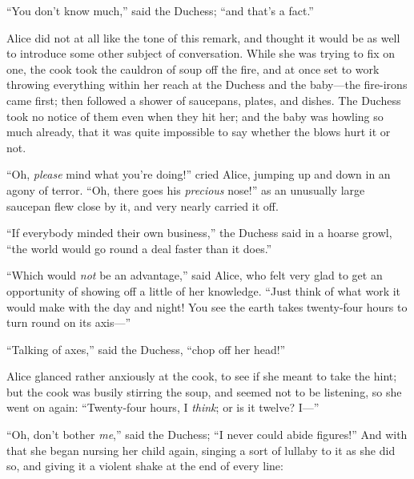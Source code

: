 \documentclass[11pt,openany,oneside]{book}
\begin{document}
“You don’t know much,” said the Duchess; “and that’s a fact.” 

Alice did not at all like the tone of this remark, and thought it would be as well to introduce some other subject of conversation. While she was trying to fix on one, the cook took the cauldron of soup off the fire, and at once set to work throwing everything within her reach at the Duchess and the baby—the fire-irons came first; then followed a shower of saucepans, plates, and dishes. The Duchess took no notice of them even when they hit her; and the baby was howling so much already, that it was quite impossible to say whether the blows hurt it or not. 

“Oh, {\em please\/} mind what you’re doing!” cried Alice, jumping up and down in an agony of terror. “Oh, there goes his {\em precious\/} nose!” as an unusually large saucepan flew close by it, and very nearly carried it off. 

“If everybody minded their own business,” the Duchess said in a hoarse growl, “the world would go round a deal faster than it does.” 

“Which would {\em not\/} be an advantage,” said Alice, who felt very glad to get an opportunity of showing off a little of her knowledge. “Just think of what work it would make with the day and night! You see the earth takes twenty-four hours to turn round on its axis—” 

“Talking of axes,” said the Duchess, “chop off her head!” 

Alice glanced rather anxiously at the cook, to see if she meant to take the hint; but the cook was busily stirring the soup, and seemed not to be listening, so she went on again: “Twenty-four hours, I {\em think\/}; or is it twelve? I—” 

“Oh, don’t bother {\em me\/},” said the Duchess; “I never could abide figures!” And with that she began nursing her child again, singing a sort of lullaby to it as she did so, and giving it a violent shake at the end of every line: 
\end{document}
